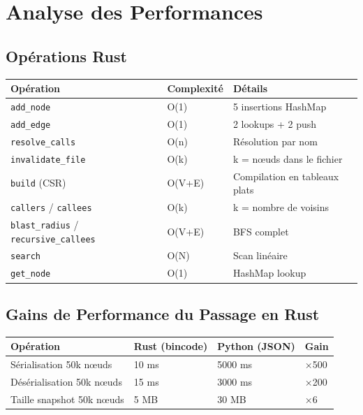 \documentclass[12pt,a4paper]{article}
\newcommand{\code}[1]{\texttt{#1}}
\begin{document}
\section{Analyse des Performances}

\subsection{Opérations Rust}

\begin{center}
\begin{tabularx}{\textwidth}{lXl}
\toprule
\textbf{Opération} & \textbf{Complexité} & \textbf{Détails} \\
\midrule
\code{add\_node} & O(1) & 5 insertions HashMap \\
\code{add\_edge} & O(1) & 2 lookups + 2 push \\
\code{resolve\_calls} & O(n) & Résolution par nom \\
\code{invalidate\_file} & O(k) & k = nœuds dans le fichier \\
\code{build} (CSR) & O(V+E) & Compilation en tableaux plats \\
\code{callers} / \code{callees} & O(k) & k = nombre de voisins \\
\code{blast\_radius} / \code{recursive\_callees} & O(V+E) & BFS complet \\
\code{search} & O(N) & Scan linéaire \\
\code{get\_node} & O(1) & HashMap lookup \\
\bottomrule
\end{tabularx}
\end{center}

\subsection{Gains de Performance du Passage en Rust}

\begin{center}
\begin{tabularx}{\textwidth}{lXXX}
\toprule
\textbf{Opération} & \textbf{Rust (bincode)} & \textbf{Python (JSON)} & \textbf{Gain} \\
\midrule
Sérialisation 50k nœuds & 10 ms & 5000 ms & ×500 \\
Désérialisation 50k nœuds & 15 ms & 3000 ms & ×200 \\
Taille snapshot 50k nœuds & 5 MB & 30 MB & ×6 \\
\bottomrule
\end{tabularx}
\end{center}
\end{document}
